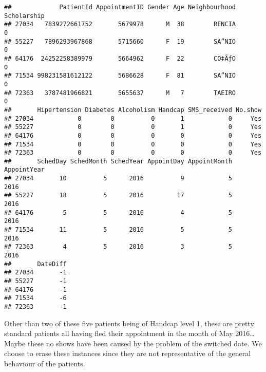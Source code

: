 \documentclass[]{article}
\newenvironment{Shaded}{\begin{snugshade}}{\end{snugshade}}
\newcommand{\KeywordTok}[1]{\textcolor[rgb]{0.13,0.29,0.53}{\textbf{#1}}}
\newcommand{\DecValTok}[1]{\textcolor[rgb]{0.00,0.00,0.81}{#1}}
\newcommand{\StringTok}[1]{\textcolor[rgb]{0.31,0.60,0.02}{#1}}
\newcommand{\OperatorTok}[1]{\textcolor[rgb]{0.81,0.36,0.00}{\textbf{#1}}}
\newcommand{\NormalTok}[1]{#1}
\begin{document}
\begin{Shaded}
\end{Shaded}

\begin{verbatim}
##             PatientId AppointmentID Gender Age Neighbourhood Scholarship
## 27034   7839272661752       5679978      M  38        RENCIA           0
## 55227   7896293967868       5715660      F  19        SA”NIO           0
## 64176  24252258389979       5664962      F  22        CO‡ÃƒO           0
## 71534 998231581612122       5686628      F  81        SA”NIO           0
## 72363   3787481966821       5655637      M   7        TAEIRO           0
##       Hipertension Diabetes Alcoholism Handcap SMS_received No.show
## 27034            0        0          0       1            0     Yes
## 55227            0        0          0       1            0     Yes
## 64176            0        0          0       0            0     Yes
## 71534            0        0          0       0            0     Yes
## 72363            0        0          0       0            0     Yes
##       SchedDay SchedMonth SchedYear AppointDay AppointMonth AppointYear
## 27034       10          5      2016          9            5        2016
## 55227       18          5      2016         17            5        2016
## 64176        5          5      2016          4            5        2016
## 71534       11          5      2016          5            5        2016
## 72363        4          5      2016          3            5        2016
##       DateDiff
## 27034       -1
## 55227       -1
## 64176       -1
## 71534       -6
## 72363       -1
\end{verbatim}

Other than two of these five patients being of Handcap level 1, these
are pretty standard patients all having fled their appointment in the
month of May 2016\ldots{} Maybe these no shows have been caused by the
problem of the switched date. We choose to erase these instances since
they are not representative of the general behaviour of the patients.

\begin{Shaded}
\end{Shaded}
\end{document}
